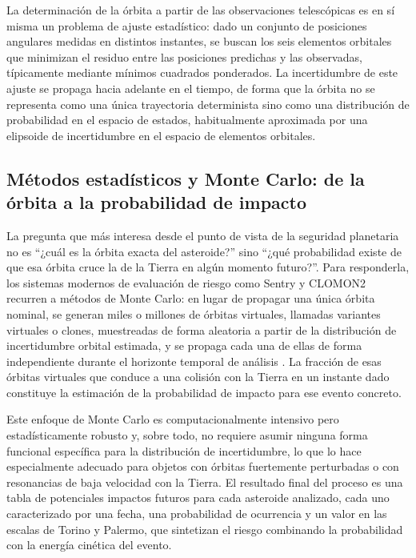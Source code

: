 \documentclass[12pt]{report} %
\begin{document}
La determinación de la órbita a partir de las observaciones telescópicas es en sí misma un problema de ajuste estadístico: dado un conjunto de posiciones angulares medidas en distintos instantes, se buscan los seis elementos orbitales que minimizan el residuo entre las posiciones predichas y las observadas, típicamente mediante mínimos cuadrados ponderados. La incertidumbre de este ajuste se propaga hacia adelante en el tiempo, de forma que la órbita no se representa como una única trayectoria determinista sino como una distribución de probabilidad en el espacio de estados, habitualmente aproximada por una elipsoide de incertidumbre en el espacio de elementos orbitales.
 
\subsection{Métodos estadísticos y Monte Carlo: de la órbita a la probabilidad de impacto}
 
La pregunta que más interesa desde el punto de vista de la seguridad planetaria no es ``¿cuál es la órbita exacta del asteroide?'' sino ``¿qué probabilidad existe de que esa órbita cruce la de la Tierra en algún momento futuro?''. Para responderla, los sistemas modernos de evaluación de riesgo como Sentry y CLOMON2 recurren a métodos de Monte Carlo: en lugar de propagar una única órbita nominal, se generan miles o millones de órbitas virtuales, llamadas variantes virtuales o clones, muestreadas de forma aleatoria a partir de la distribución de incertidumbre orbital estimada, y se propaga cada una de ellas de forma independiente durante el horizonte temporal de análisis \cite{milani1999theory}. La fracción de esas órbitas virtuales que conduce a una colisión con la Tierra en un instante dado constituye la estimación de la probabilidad de impacto para ese evento concreto.
 
Este enfoque de Monte Carlo es computacionalmente intensivo pero estadísticamente robusto y, sobre todo, no requiere asumir ninguna forma funcional específica para la distribución de incertidumbre, lo que lo hace especialmente adecuado para objetos con órbitas fuertemente perturbadas o con resonancias de baja velocidad con la Tierra. El resultado final del proceso es una tabla de potenciales impactos futuros para cada asteroide analizado, cada uno caracterizado por una fecha, una probabilidad de ocurrencia y un valor en las escalas de Torino y Palermo, que sintetizan el riesgo combinando la probabilidad con la energía cinética del evento.
 
\end{document}
